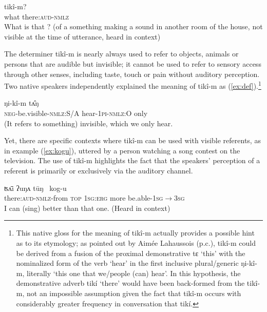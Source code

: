 \documentclass[oneside,a4paper,11pt]{article}
\newcommand{\ipa}[1]{{\phon \mbox{#1}}} %
\begin{document}
\begin{exe}
\ex \label{ex:what}
\gll  	\ipa{mâŋ}  	 	\ipa{tikî-m?}   \\
what  there:\textsc{aud}-\textsc{nmlz} \\
\glt What is that ? (of a something making a sound in another room of the house, not visible at the time of utterance, heard in context)
\end{exe}

The determiner \ipa{tikî-m} is nearly always used to refer to objects, animals or persons  that are audible but invisible; it cannot be used to refer to sensory access through other senses, including taste, touch or pain without auditory perception. Two native speakers independently explained the meaning of  \ipa{tikî-m} as (\ref{ex:def}).\footnote{This native gloss for the meaning of \ipa{tikî-m} actually provides a possible hint as to its etymology; as pointed out by Aimée Lahaussois (p.c.), \ipa{tikî-m} could be derived from a fusion of the proximal demonstrative \ipa{tɛ} `this' with the nominalized form of the verb `hear' in the first inclusive plural/generic \ipa{ŋi-kî-m}, literally `this one that we/people (can) hear'. In this hypothesis, the demonstrative adverb \ipa{tikí} `there' would have been back-formed from the \ipa{tikî-m}, not an impossible assumption given the fact that  \ipa{tikî-m} occurs with considerably greater frequency in conversation that  \ipa{tikí}. }

\begin{exe}
\ex \label{ex:def}
\gll  	 	 \ipa{mu-toɔç-pɛ,} \ipa{ŋi-kî-m} \ipa{tʌ̂ŋ}   \\
\textsc{neg}-be.visible-\textsc{nmlz:S/A} hear-\textsc{1pi-nmlz:O} only  \\
\glt (It refers to something) invisible, which we only hear.
\end{exe}

Yet, there are specific contexts where \ipa{tikî-m}  can be used with visible referents, as in example  (\ref{ex:kogu}), uttered by a person watching a song contest on the television. The use of \ipa{tikî-m} highlights the  fact that the  speakers' perception of a referent is primarily or exclusively via the auditory channel.

\begin{exe}
\ex \label{ex:kogu}
\gll  	\ipa{tikî-m-kʌ}   	\ipa{ʦʌ̄i} \ipa{ʔuŋʌ} \ipa{tūŋ }   	\ipa{kog-u}   \\
there:\textsc{aud}-\textsc{nmlz}-from \textsc{top} \textsc{1sg:erg} more be.able-\textsc{1sg$\rightarrow$3sg}	  \\
\glt I can (sing) better than that one. (Heard in context)
\end{exe}
\end{document}
